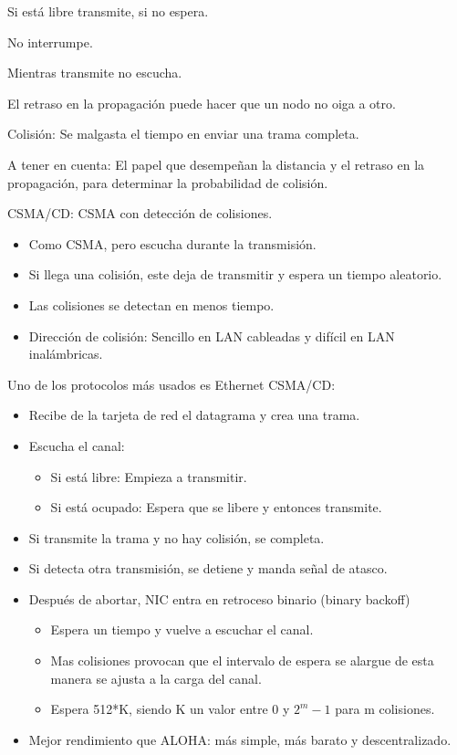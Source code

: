 \documentclass[12pt, twoside, openright]{report} %
\begin{document}
Si está libre transmite, si no espera.

No interrumpe.

Mientras transmite no escucha.

El retraso en la propagación puede hacer que un nodo no oiga a
otro.

Colisión: Se malgasta el tiempo en enviar una trama completa.

A tener en cuenta: El papel que desempeñan la distancia y el
retraso en la propagación, para determinar la probabilidad de
colisión.

CSMA/CD: CSMA con detección de colisiones.

\begin{itemize}
	\item Como CSMA, pero escucha durante la transmisión.
	\item Si llega una colisión, este deja de transmitir y espera un
	      tiempo aleatorio.
	\item Las colisiones se detectan en menos tiempo.
	\item Dirección de colisión: Sencillo en LAN cableadas y difícil
	      en LAN inalámbricas.
\end{itemize}

Uno de los protocolos más usados es Ethernet CSMA/CD:

\begin{itemize}
	\item Recibe de la tarjeta de red el datagrama y crea una trama.
	\item Escucha el canal:

	      \begin{itemize}
		      \item Si está libre: Empieza a transmitir.
		      \item Si está ocupado: Espera que se libere y entonces
		            transmite.
	      \end{itemize}
	\item Si transmite la trama y no hay colisión, se completa.
	\item Si detecta otra transmisión, se detiene y manda señal de
	      atasco.
	\item Después de abortar, NIC entra en retroceso binario (binary
	      backoff)

	      \begin{itemize}
		      \item Espera un tiempo y vuelve a escuchar el canal.
		      \item Mas colisiones provocan que el intervalo de espera se
		            alargue de esta manera se ajusta a la carga del canal.
		      \item Espera 512*K, siendo K un valor entre 0 y \(2^{m}-1\) para
		            m colisiones.
	      \end{itemize}
	\item Mejor rendimiento que ALOHA: más simple, más barato y
	      descentralizado.
\end{itemize}
\end{document}
